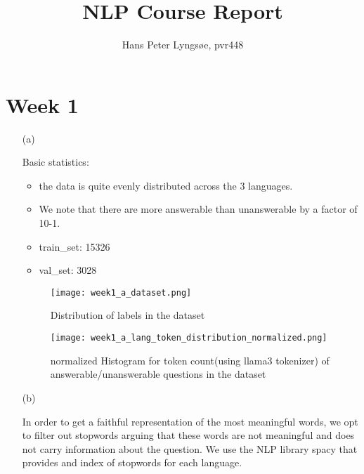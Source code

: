 \documentclass[11pt]{article}
\begin{document}
\title{NLP Course Report}
\author{Hans Peter Lyngsøe, pvr448}

\maketitle

\section{Week 1}
\begin{enumerate}
    \item[(a)] 

    Basic statistics:
    \begin{itemize}
        \item the data is quite evenly distributed across the 3 languages.
        \item We note that there are more answerable than unanswerable by a factor of 10-1.
        \item train\_set: 15326
        \item val\_set: 3028
    \end{itemize}

    \begin{figure}[ht]
        \centering
        \texttt{[image: week1\_a\_dataset.png]}
        \caption{Distribution of labels in the dataset}
        \label{fig:label_distribution}
    \end{figure}

    \begin{figure}[ht]
        \centering
        \texttt{[image: week1\_a\_lang\_token\_distribution\_normalized.png]}
        \caption{normalized Histogram for token count(using llama3 tokenizer) of answerable/unanswerable questions in the dataset}
        \label{fig:language_distribution}
    \end{figure}

    \item[(b)] 

    In order to get a faithful representation of the most meaningful words, we opt to filter out stopwords arguing that these words are not meaningful and does not carry information about the question.
    We use the NLP library spacy that provides and index of stopwords for each language.


\end{enumerate}
\end{document}
